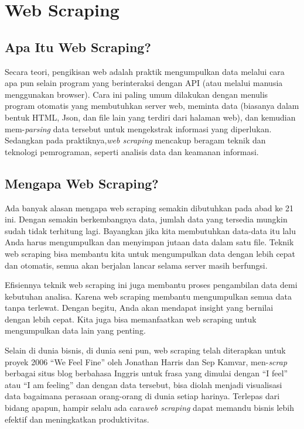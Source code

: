 \section{Web Scraping}
\subsection{Apa Itu Web Scraping?}
\par Secara teori, pengikisan web adalah praktik mengumpulkan data melalui cara apa pun selain program yang berinteraksi dengan API (atau melalui manusia menggunakan browser). Cara ini paling umum dilakukan dengan menulis program otomatis yang membutuhkan server web, meminta data (biasanya dalam bentuk HTML, Json, dan file lain yang terdiri dari halaman web), dan kemudian mem-\textit{parsing} data tersebut untuk mengekstrak informasi yang diperlukan. Sedangkan pada praktiknya,\textit{web scraping} mencakup beragam teknik dan teknologi pemrograman, seperti analisis data dan keamanan informasi.

\subsection{Mengapa Web Scraping?}
\par Ada banyak alasan mengapa web scraping semakin dibutuhkan pada abad ke 21 ini. Dengan semakin berkembangnya data, jumlah data yang tersedia mungkin sudah tidak terhitung lagi. Bayangkan jika kita membutuhkan data-data itu lalu Anda harus mengumpulkan dan menyimpan jutaan data dalam satu file. Teknik web scraping bisa membantu kita untuk mengumpulkan data dengan lebih cepat dan otomatis, semua akan berjalan lancar selama server masih berfungsi.

Efisiennya teknik web scraping ini juga membantu proses pengambilan data demi kebutuhan analisa. Karena web scraping membantu mengumpulkan semua data tanpa terlewat. Dengan begitu, Anda akan mendapat insight yang bernilai dengan lebih cepat. Kita juga bisa memanfaatkan web scraping untuk mengumpulkan data lain yang penting.

Selain di dunia bisnis, di dunia seni pun, web scraping telah diterapkan untuk proyek 2006 “We Feel Fine” oleh Jonathan Harris dan Sep Kamvar, men-\textit{scrap} berbagai situs blog berbahasa Inggris untuk frasa yang dimulai dengan “I feel” atau “I am feeling” dan dengan data tersebut, bisa diolah menjadi visualisasi data bagaimana perasaan orang-orang di dunia setiap harinya. Terlepas dari bidang apapun, hampir selalu ada cara\textit{web scraping} dapat memandu bisnis lebih efektif dan meningkatkan produktivitas.

